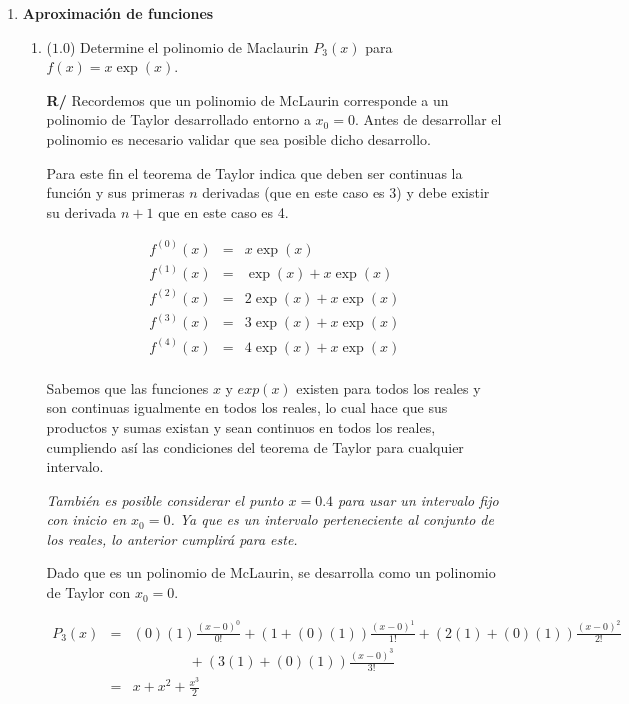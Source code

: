 \documentclass[12pt]{article}
\begin{document}
  \begin{enumerate}[leftmargin=*,widest=9]

    \item \textbf{Aproximación de funciones}

    \begin{enumerate}[label=\alph*]
    \item (\(1.0\)) Determine el polinomio de Maclaurin \(P_3(x)\) para \(f(x) = x \exp(x) \).
    
   
   \textbf{R/} Recordemos que un polinomio de McLaurin corresponde a un polinomio de Taylor desarrollado entorno a \(x_0=0\). Antes de desarrollar el polinomio es necesario validar que sea posible dicho desarrollo.
   
   Para este fin el teorema de Taylor indica que deben ser continuas la función y sus primeras \(n\) derivadas (que en este caso es 3) y debe existir su derivada \(n+1\) que en este caso es 4.
   
   \begin{eqnarray*}
   f^{(0)}(x) &=& x \exp(x) \\
   f^{(1)}(x) &=& \exp(x) + x \exp(x) \\
   f^{(2)}(x) &=& 2\exp(x) + x \exp(x) \\
   f^{(3)}(x) &=& 3\exp(x) + x \exp(x) \\
   f^{(4)}(x) &=& 4\exp(x) + x \exp(x) \\
   \end{eqnarray*}
   
   Sabemos que las funciones \(x\) y \(exp(x)\) existen para todos los reales y son continuas igualmente en todos los reales, lo cual hace que sus productos y sumas existan y sean continuos en todos los reales, cumpliendo así las condiciones del teorema de Taylor para cualquier intervalo.
   
\textit{También es posible considerar el punto \(x = 0.4\) para usar un intervalo fijo con inicio en \(x_0=0\). Ya que es un intervalo perteneciente al conjunto de los reales, lo anterior cumplirá para este.}

Dado que es un polinomio de McLaurin, se desarrolla como un polinomio de Taylor con \(x_0=0\).

\begin{eqnarray*}
P_3(x) & = & (0)(1) \frac{(x-0)^0}{0!} + (1 + (0)(1)) \frac{(x-0)^1}{1!} + (2(1) + (0)(1)) \frac{(x-0)^2}{2!} \\
&& \qquad \qquad + (3(1) + (0)(1)) \frac{(x-0)^3}{3!}\\
& = & x + x^2 + \frac{x^3}{2}
\end{eqnarray*}


\end{enumerate}
\end{enumerate}
\end{document}

